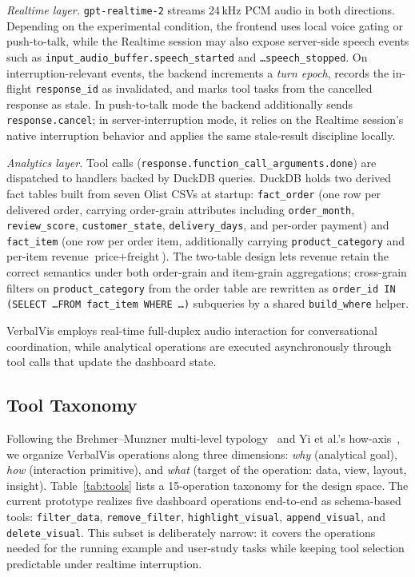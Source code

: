 \documentclass[journal]{IEEEtran}
\begin{document}
\noindent\emph{Realtime layer.} \texttt{gpt-realtime-2} streams 24\,kHz PCM audio in both directions. Depending on the experimental condition, the frontend uses local voice gating or push-to-talk, while the Realtime session may also expose server-side speech events such as \texttt{input\_audio\_buffer.speech\_started} and \texttt{\dots speech\_stopped}. On interruption-relevant events, the backend increments a \emph{turn epoch}, records the in-flight \texttt{response\_id} as invalidated, and marks tool tasks from the cancelled response as stale. In push-to-talk mode the backend additionally sends \texttt{response.cancel}; in server-interruption mode, it relies on the Realtime session's native interruption behavior and applies the same stale-result discipline locally.

\noindent\emph{Analytics layer.} Tool calls (\texttt{response.function\_call\_arguments.done}) are dispatched to handlers backed by DuckDB queries. DuckDB holds two derived fact tables built from seven Olist CSVs at startup: \texttt{fact\_order} (one row per delivered order, carrying order-grain attributes including \texttt{order\_month}, \texttt{review\_score}, \texttt{customer\_state}, \texttt{delivery\_days}, and per-order payment) and \texttt{fact\_item} (one row per order item, additionally carrying \texttt{product\_category} and per-item revenue $\textrm{price} + \textrm{freight}$). The two-table design lets revenue retain the correct semantics under both order-grain and item-grain aggregations; cross-grain filters on \texttt{product\_category} from the order table are rewritten as \texttt{order\_id IN (SELECT \dots FROM fact\_item WHERE \dots)} subqueries by a shared \texttt{build\_where} helper.

VerbalVis employs real-time full-duplex audio interaction for conversational coordination, while analytical operations are executed asynchronously through tool calls that update the dashboard state.

\subsection{Tool Taxonomy}
Following the Brehmer--Munzner multi-level typology~\cite{brehmer2013multi} and Yi et al.'s how-axis~\cite{yi2007toward}, we organize VerbalVis operations along three dimensions: \emph{why} (analytical goal), \emph{how} (interaction primitive), and \emph{what} (target of the operation: data, view, layout, insight). Table~\ref{tab:tools} lists a 15-operation taxonomy for the design space. The current prototype realizes five dashboard operations end-to-end as schema-based tools: \texttt{filter\_data}, \texttt{remove\_filter}, \texttt{highlight\_visual}, \texttt{append\_visual}, and \texttt{delete\_visual}. This subset is deliberately narrow: it covers the operations needed for the running example and user-study tasks while keeping tool selection predictable under realtime interruption.
\end{document}
